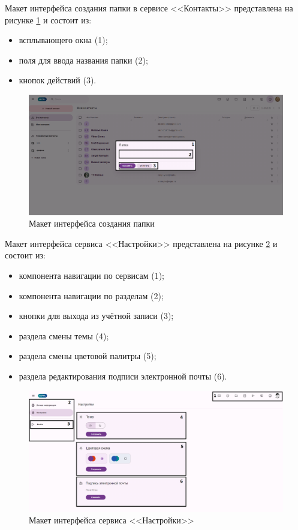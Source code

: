 Макет интерфейса создания папки в сервисе <<Контакты>> представлена на рисунке \ref{templ:image5c} и состоит из:
\begin{itemize}
  \item всплывающего окна (1);
  \item поля для ввода названия папки (2);
  \item кнопок действий (3).
\end{itemize}
\begin{figure}[H]
	\centering
	\includegraphics[width=1\linewidth]{images/контакты4}
	\caption{Макет интерфейса создания папки}
	\label{templ:image5c}
\end{figure}

Макет интерфейса сервиса <<Настройки>> представлена на рисунке \ref{templ:image6} и состоит из:
\begin{itemize}
  \item компонента навигации по сервисам (1);
  \item компонента навигации по разделам (2);
  \item кнопки для выхода из учётной записи (3);
  \item раздела смены темы (4);
  \item раздела смены цветовой палитры (5);
  \item раздела редактирования подписи электронной почты (6).
\end{itemize}
\begin{figure}[H]
	\centering
	\includegraphics[width=1\linewidth]{images/настройки}
	\caption{Макет интерфейса сервиса <<Настройки>>}
	\label{templ:image6}
\end{figure}

